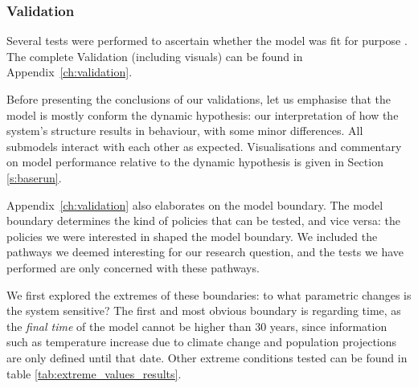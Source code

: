 

\subsubsection{Validation}    


Several tests were performed to ascertain whether the model was fit for purpose \parencite{forrester_tests_1980}. The complete Validation (including visuals) can be found in Appendix~\ref{ch:validation}.

Before presenting the conclusions of our validations, let us emphasise that the model is mostly conform the dynamic hypothesis: our interpretation of how the system's structure results in behaviour, with some minor differences. All submodels interact with each other as expected. Visualisations and commentary on model performance relative to the dynamic hypothesis is given in Section \ref{s:baserun}.
    
Appendix~\ref{ch:validation} also elaborates on the model boundary. The model boundary determines the kind of policies that can be tested, and vice versa: the policies we were interested in shaped the model boundary. We included the pathways we deemed interesting for our research question, and the tests we have performed are only concerned with these pathways.

We first explored the extremes of these boundaries: to what parametric changes is the system sensitive? The first and most obvious boundary is regarding time, as the \textit{final time} of the model cannot be higher than 30 years, since information such as temperature increase due to climate change and population projections are only defined until that date. Other extreme conditions tested can be found in table \ref{tab:extreme_values_results}.

